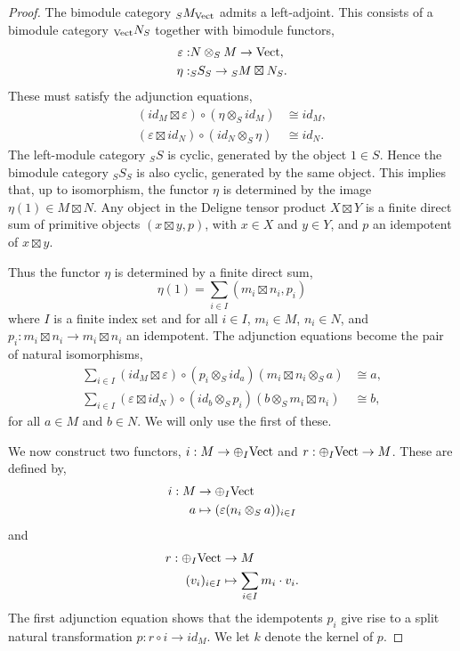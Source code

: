 \documentclass{amsart}
\begin{document}
\begin{proof}
	The bimodule category ${}_S M_{\mathrm{Vect}}$ admits a left-adjoint. This consists of a bimodule category ${}_{\mathrm{Vect}}N_S$ together with bimodule functors,
	\begin{align*}
		\varepsilon: & N \otimes_S M \to \mathrm{Vect}, \\
		\eta: & {}_S S_S \to {}_S M \boxtimes N_S. 
	\end{align*}
	These must satisfy the adjunction equations,
	\begin{align*}
		(id_M \boxtimes \varepsilon) \circ (\eta \otimes_S id_M) &\cong id_M, \\
		(\varepsilon \boxtimes id_N) \circ (id_N \otimes_S \eta) & \cong id_N.
	\end{align*}
	The left-module category ${}_S S$ is cyclic, generated by the object $1 \in S$. Hence the bimodule category ${}_S S_S$ is also cyclic, generated by the same object. This implies that, up to isomorphism, the functor $\eta$ is determined by the image $\eta(1) \in M \boxtimes N $. Any object in the Deligne tensor product $X \boxtimes Y$ is a finite direct sum of primitive objects $(x \boxtimes y, p)$, with $x \in X$ and $y \in Y$, and $p$ an idempotent of $x \boxtimes y$.

	
	 Thus the functor $\eta$ is determined by a finite direct sum,
	\begin{equation*}
		\eta(1) = \sum_{i \in I} (m_i \boxtimes n_i , p_i)
	\end{equation*} 
	where $I$ is a finite index set and for all $i \in I$,  $m_i \in M$, $n_i \in N$, and $p_i: m_i \boxtimes n_i \to m_i \boxtimes n_i$ an idempotent. The adjunction equations become the pair of natural isomorphisms,
	\begin{align*}
		\sum_{i \in I}   (id_M \boxtimes \varepsilon) \circ (p_i \otimes_S id_a) (m_i \boxtimes n_i \otimes_S a) & \cong a, \\
		\sum_{i \in I}   ( \varepsilon \boxtimes id_N) \circ (id_b \otimes_S p_i) (b \otimes_S m_i \boxtimes  n_i) & \cong b,
	\end{align*}
	for all $a \in M$ and $b \in N$. We will only use the first of these. 
	
We now construct two functors, $i: M \to \oplus_I \mathrm{Vect}$ and $r: \oplus_I \mathrm{Vect} \to M$. These are defined by,
\begin{align*}
	i: M & \to \oplus_I \mathrm{Vect} \\
	a & \mapsto (\varepsilon(n_i \otimes_S a) )_{i \in I}
\end{align*}	
and 
\begin{align*}
	r: \oplus_I \mathrm{Vect} & \to M \\
	(v_i)_{i \in I} & \mapsto \sum_{i \in I} m_i \cdot v_i.
\end{align*}	
The first adjunction equation shows that the idempotents $p_i$ give rise to a split natural transformation $p: r \circ i \to id_M$. We let $k$ denote the kernel of $p$.
\end{proof}
\end{document}

